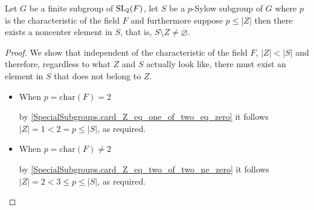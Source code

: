 \begin{lemma}
  \label{MaximalAbelianSubgroup.exists_noncenter_of_card_center_lt_card_center_Sylow}
  \leanok
  Let $G$ be a finite subgroup of $\operatorname{SL}_2(F)$, let $S$ be a $p$-Sylow subgroup of $G$ where $p$ is the characteristic of the field $F$ and furthermore suppose $p \le |Z|$ then
  there exists a noncenter element in $S$, that is, $S \setminus Z \ne \varnothing$.
\end{lemma}
\begin{proof}
  \leanok
  We show that independent of the characteristic of the field $F$, $|Z| < |S|$ and therefore, regardless to what $Z$ and $S$ actually look like,
  there must exist an element in $S$ that does not belong to $Z$.

  \begin{itemize}
    \item When $p = \textrm{char}(F) = 2$
    
    by \ref{SpecialSubgroups.card_Z_eq_one_of_two_eq_zero} it follows $|Z| = 1 < 2 = p \leq |S|$, as required.
  
    
    \item When $p = \textrm{char}(F) \ne 2$
    
    by \ref{SpecialSubgroups.card_Z_eq_two_of_two_ne_zero} it follows $|Z| = 2 < 3 \le p \le |S|$, as required.
  \end{itemize}
\end{proof}
